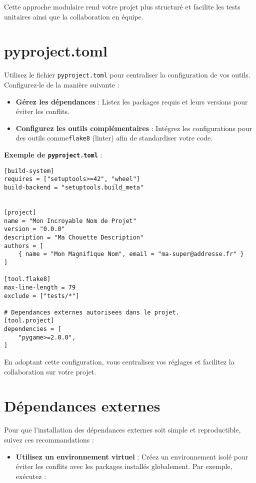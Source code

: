 \documentclass[a4paper,12pt]{article}
\begin{document}
Cette approche modulaire rend votre projet plus structuré et facilite les tests unitaires ainsi que la collaboration en équipe.
\section{pyproject.toml}

Utilisez le fichier \texttt{pyproject.toml} pour centraliser la configuration de vos outils. Configurez-le de la manière suivante :

\begin{itemize}
    \item \textbf{Gérez les dépendances} : Listez les packages requis et leurs versions pour éviter les conflits.
    \item \textbf{Configurez les outils complémentaires} : Intégrez les configurations pour des outils comme\texttt{flake8} (linter) afin de standardiser votre code.
\end{itemize}

\textbf{Exemple de \texttt{pyproject.toml}} :

\begin{lstlisting}
[build-system]
requires = ["setuptools>=42", "wheel"]
build-backend = "setuptools.build_meta"


[project]
name = "Mon Incroyable Nom de Projet"
version = "0.0.0"
description = "Ma Chouette Description"
authors = [
    { name = "Mon Magnifique Nom", email = "ma-super@addresse.fr" }
]

[tool.flake8]
max-line-length = 79
exclude = ["tests/*"]

# Dependances externes autorisees dans le projet.
[tool.project]
dependencies = [
    "pygame>=2.0.0",
]
\end{lstlisting}

En adoptant cette configuration, vous centralisez vos réglages et facilitez la collaboration sur votre projet.


\section{Dépendances externes}

Pour que l'installation des dépendances externes soit simple et reproductible, suivez ces recommandations :

\begin{itemize}
    \item \textbf{Utilisez un environnement virtuel} : Créez un environnement isolé pour éviter les conflits avec les packages installés globalement. Par exemple, exécutez :
\end{itemize}
\end{document}
